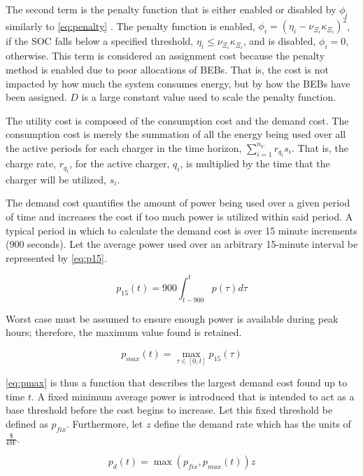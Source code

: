 \documentclass[11pt,a4paper,final]{article}
\begin{document}
The second term is the penalty function that is either enabled or disabled by \(\phi_i\) similarly to \ref{eq:penalty}
\cite{luenberger-2008-penal-barrier-method}. The penalty function is enabled, \(\phi_i = (\eta_i - \nu_{\Xi_i} \kappa_{\Xi_i})^2\), if the
SOC falls below a specified threshold, \(\eta_i \le \nu_{\Xi_i} \kappa_{\Xi_i}\), and is disabled, \(\phi_i = 0\), otherwise. This term is
considered an assignment cost because the penalty method is enabled due to poor allocations of BEBs. That is, the cost
is not impacted by how much the system consumes energy, but by how the BEBs have been assigned. \(D\) is a large constant
value used to scale the penalty function.

The utility cost is composed of the consumption cost and the demand cost. The consumption cost is merely the summation
of all the energy being used over all the active periods for each charger in the time horizon, \(\sum_{i=1}^{n_V}
r_{q_i}s_i\). That is, the charge rate, \(r_{q_i}\), for the active charger, \(q_i\), is multiplied by the time that the
charger will be utilized, \(s_i\).

The demand cost quantifies the amount of power being used over a given period of time and increases the cost if too much
power is utilized within said period. A typical period in which to calculate the demand cost is over 15 minute
increments (900 seconds). Let the average power used over an arbitrary 15-minute interval be represented by \ref{eq:p15}.

\begin{equation}
\label{eq:p15}
p_{15}(t) = 900 \int_{t-900}^{t} p(\tau) d\tau
\end{equation}

Worst case must be assumed to ensure enough power is available during peak hours; therefore, the maximum value found is
retained.

\begin{equation}
\label{eq:pmax}
p_{max}(t) = \max\limits_{\tau \in [0,t]}p_{15}(\tau)
\end{equation}

\ref{eq:pmax} is thus a function that describes the largest demand cost found up to time \(t\). A fixed minimum average power is
introduced that is intended to act as a base threshold before the cost begins to increase. Let this fixed threshold be
defined as \(p_{fix}\). Furthermore, let \(z\) define the demand rate which has the units of \(\frac{\$}{kW}\).

\begin{equation}
\label{eq:pdem}
p_d(t) = \max(p_{fix},p_{max}(t))z
\end{equation}
\end{document}
